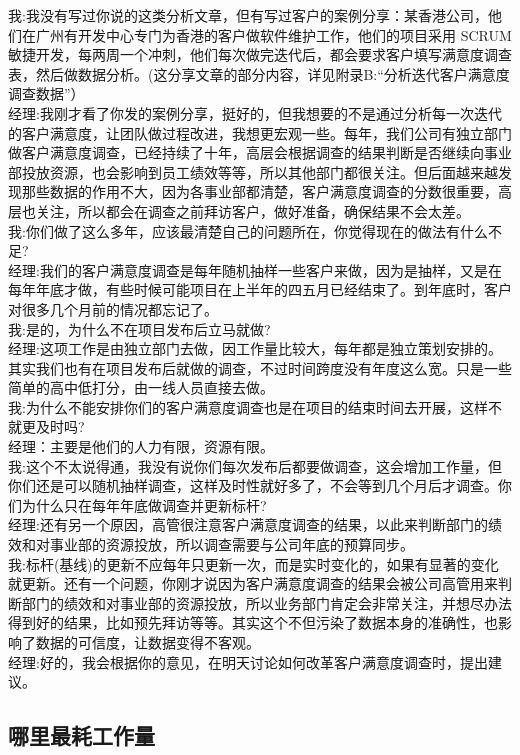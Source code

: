 我:我没有写过你说的这类分析文章，但有写过客户的案例分享：某香港公司，他们在广州有开发中心专门为香港的客户做软件维护工作，他们的项目采用
SCRUM
敏捷开发，每两周一个冲刺，他们每次做完迭代后，都会要求客户填写满意度调查表，然后做数据分析。(这分享文章的部分内容，详见附录B:``分析迭代客户满意度调查数据''）\\
经理:我刚才看了你发的案例分享，挺好的，但我想要的不是通过分析每一次迭代的客户满意度，让团队做过程改进，我想更宏观一些。每年，我们公司有独立部门做客户满意度调查，已经持续了十年，高层会根据调查的结果判断是否继续向事业部投放资源，也会影响到员工绩效等等，所以其他部门都很关注。但后面越来越发现那些数据的作用不大，因为各事业部都清楚，客户满意度调查的分数很重要，高层也关注，所以都会在调查之前拜访客户，做好准备，确保结果不会太差。\\
我:你们做了这么多年，应该最清楚自己的问题所在，你觉得现在的做法有什么不足?\\
经理:我们的客户满意度调查是每年随机抽样一些客户来做，因为是抽样，又是在每年年底才做，有些时候可能项目在上半年的四五月已经结束了。到年底时，客户对很多几个月前的情况都忘记了。\\
我:是的，为什么不在项目发布后立马就做?\\
经理:这项工作是由独立部门去做，因工作量比较大，每年都是独立策划安排的。其实我们也有在项目发布后就做的调查，不过时间跨度没有年度这么宽。只是一些简单的高中低打分，由一线人员直接去做。\\
我:为什么不能安排你们的客户满意度调查也是在项目的结束时间去开展，这样不就更及时吗?\\
经理：主要是他们的人力有限，资源有限。\\
我:这个不太说得通，我没有说你们每次发布后都要做调查，这会增加工作量，但你们还是可以随机抽样调查，这样及时性就好多了，不会等到几个月后才调查。你们为什么只在每年年底做调查并更新标杆?\\
经理:还有另一个原因，高管很注意客户满意度调查的结果，以此来判断部门的绩效和对事业部的资源投放，所以调查需要与公司年底的预算同步。\\
我:标杆(基线)的更新不应每年只更新一次，而是实时变化的，如果有显著的变化就更新。还有一个问题，你刚才说因为客户满意度调查的结果会被公司高管用来判断部门的绩效和对事业部的资源投放，所以业务部门肯定会非常关注，并想尽办法得到好的结果，比如预先拜访等等。其实这个不但污染了数据本身的准确性，也影响了数据的可信度，让数据变得不客观。\\
经理:好的，我会根据你的意见，在明天讨论如何改革客户满意度调查时，提出建议。\\


\hypertarget{ux54eaux91ccux6700ux8017ux5de5ux4f5cux91cf}{%
\subsection{哪里最耗工作量}\label{ux54eaux91ccux6700ux8017ux5de5ux4f5cux91cf}}

